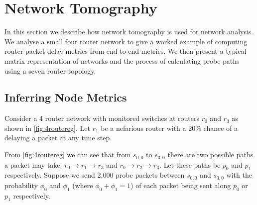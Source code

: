 \section{Network Tomography}
\label{sec:Bnetworktomography}
In this section we describe how network tomography is used for network analysis. We analyse a small four router network to give a worked example of computing router packet delay metrics from end-to-end metrics. We then present a typical matrix representation of networks and the process of calculating probe paths using a seven router topology.

\subsection{Inferring Node Metrics}
\label{ssec:B4routerexample}
Consider a 4 router network with monitored switches at routers $r_0$ and $r_3$ as shown in \cref{fig:4routereg}. Let $r_1$ be a nefarious router with a $20\%$ chance of a delaying a packet at any time step.\par
From \cref{fig:4routereg} we can see that from $s_{0,0}$ to $s_{3,0}$ there are two possible paths a packet may take: $r_0\rightarrow r_1\rightarrow r_3$ and $r_0\rightarrow r_2\rightarrow r_3$. Let these paths be $p_0$ and $p_1$ respectively. Suppose we send 2,000 probe packets between $s_{0,0}$ and $s_{3,0}$ with the probability $\phi_0$ and $\phi_1$ (where $\phi_0+\phi_1=1$) of each packet being sent along $p_0$ or $p_1$ respectively.\par
